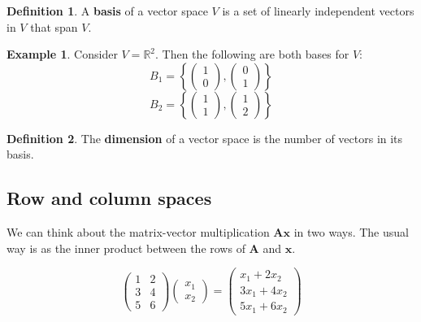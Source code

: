 \documentclass[
]{book}
\theoremstyle{definition}
\newtheorem{definition}{Definition}[chapter]
\theoremstyle{definition}
\newtheorem{example}{Example}[chapter]
\theoremstyle{definition}
\theoremstyle{definition}
\theoremstyle{remark}
\begin{document}
\begin{definition}
\protect\hypertarget{def:basis}{}\label{def:basis}A \textbf{basis} of a vector space \(V\) is a set of linearly independent vectors in \(V\) that span \(V\).
\end{definition}

\begin{example}
\protect\hypertarget{exm:basisRp}{}\label{exm:basisRp}Consider \(V=\mathbb{R}^2\). Then the following are both bases for \(V\):
\[B_1=\left\{\left(\begin{array}{c}1\\0\end{array}\right), \left(\begin{array}{c}0\\1\end{array}\right)\right\}
\]
\[B_2=\left\{\left(\begin{array}{c}1\\1\end{array}\right), \left(\begin{array}{c}1\\2\end{array}\right)\right\}
\]
\end{example}

\begin{definition}
\protect\hypertarget{def:dimension}{}\label{def:dimension}The \textbf{dimension} of a vector space is the number of vectors in its basis.
\end{definition}

\hypertarget{colsspace}{%
\subsection{Row and column spaces}\label{colsspace}}

We can think about the matrix-vector multiplication \(\mathbf A\mathbf x\) in two ways. The usual way is as the inner product between the rows of \(\mathbf A\) and \(\mathbf x\).

\[ \left( \begin{array}{cc} 1 & 2\\ 3&4\\5&6\end{array}\right) \left(\begin{array}{c}x_1\\ x_2\end{array}\right) = \left(\begin{array}{c} x_1+2x_2\\3x_1+4x_2\\5x_1+6x_2\end{array}\right)\]
\end{document}
